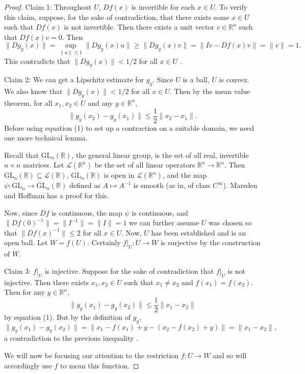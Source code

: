 \documentclass[11pt]{article}
\theoremstyle{definition}
\newcommand{\R}{\mathbb{R}}                      %
\begin{document}
\begin{proof}
    Claim 1: Throughout $U$, $Df(x)$ is invertible for each $x\in U$. To verify this claim, suppose, for the sake of contradiction, that there exists some $x\in U$ such that $Df(x)$ is not invertible. Then there exists a unit vector $v\in \R^n$ such that $Df(x)v=0$. Then 
    $$
    \|Dg_y(x)\|=\sup_{\|u\|\leq 1}\|Dg_y(x)u\|\geq \|Dg_y(x)v\|=\|Iv-Df(x)v\|=\|v\|=1.
    $$
    This contradicts that $\|Dg_y(x)\|<1/2$ for all $x\in U$ \lightning.

    Claim 2: We can get a Lipschitz estimate for $g_y$. Since $U$ is a ball, $U$ is convex. We also know that $\|Dg_y(x)\|<1/2$ for all $x\in U$. Then by the mean value theorem, for all $x_1,x_2\in U$ and any $y\in \R^n$, 
    \begin{equation}
    \|g_y(x_2)-g_y(x_1)\|\leq \frac{1}{2}\|x_2-x_1\|.
    \end{equation}
    Before using equation (1) to set up a contraction on a suitable domain, we need one more technical lemma. 

    Recall that $\mathrm{GL}_n (\R)$, the general linear group, is the set of all real, invertible $n\times n$ matrices. Let $\mathcal{L}(\R^n)$ be the set of all linear operators $\R^n\to \R^n$. Then $\mathrm{GL}_n(\R)\subseteq \mathcal{L}(\R)$, $\mathrm{GL}_n(\R)$ is open in $\mathcal{L}(\R^n)$, and the map $\psi : \mathrm{GL}_n\to \mathrm{GL}_n(\R)$ defined as $A\mapsto A^{-1}$ is smooth (as in, of class $C^\infty$). Marsden and Hoffman has a proof for this.


    Now, since $Df$ is continuous, the map $\psi$ is continuous, and $\|Df(0)^{-1}\|=\|I^{-1}\|=\|I\|=1$ we can further assume $U$ was chosen so that $\|Df(x)^{-1}\|\leq 2$ for all $x\in U$. Now, $U$ has been established and is an open ball. Let $W=f(U)$. Certainly $f|_U:U\to W$ is surjective by the construction of $W$.
    
    Claim 3: $f|_U$ is injective. Suppose for the sake of contradiction that $f|_U$ is not injective. Then there exists $x_1,x_2\in U$ such that $x_1\neq x_2$ and $f(x_1)=f(x_2)$. Then for any $y\in \R^n$,
    $$
    \|g_y(x_1)-g_y(x_2)\|\leq \frac{1}{2}\|x_1-x_2\|
    $$
    by equation (1). But by the definition of $g_y$, 
    $$
    \|g_y(x_1)-g_y(x_2)\|=\|x_1-f(x_1)+y -(x_2-f(x_2)+y)\|=\|x_1-x_2\|,
    $$
    a contradiction to the previous inequality \lightning.


    We will now be focusing our attention to the restriction $f:U\to W$ and so will accordingly use $f$ to mean this function.
    

\end{proof}
\end{document}
